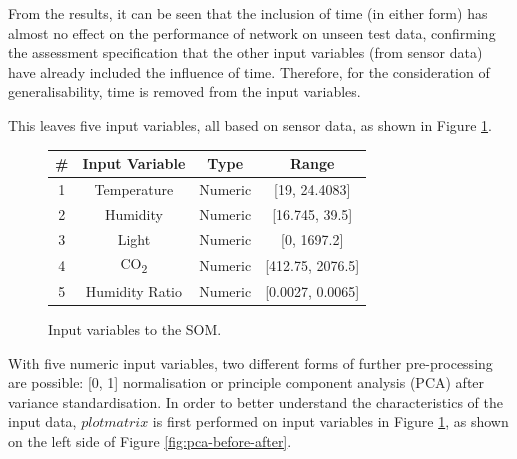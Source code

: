\documentclass[10pt, oneside]{article}
\begin{document}
From the results, it can be seen that the inclusion of time (in either form) has almost no effect on the performance of network on unseen test data, confirming the assessment specification that the other input variables (from sensor data) have already included the influence of time. Therefore, for the consideration of generalisability, time is removed from the input variables.

This leaves five input variables, all based on sensor data, as shown in Figure \ref{fig:final-variables}. 

\begin{figure}[h]
\begin{center}
\fontsize{9}{11}\selectfont
\begin{tabular}{|c|c|c|c|}
\hline 
\# & Input Variable & Type & Range \\ \hline 
1 & Temperature & Numeric & [19, 24.4083] \\ \hline 
2 & Humidity & Numeric & [16.745, 39.5] \\ \hline 
3 & Light & Numeric & [0, 1697.2] \\ \hline 
4 & CO\textsubscript{2} & Numeric & [412.75, 2076.5] \\ \hline
5 & Humidity Ratio & Numeric & [0.0027, 0.0065] \\ \hline
\end{tabular}
\end{center}
\caption{\label{fig:final-variables} Input variables to the SOM.}
\end{figure}

With five numeric input variables, two different forms of further pre-processing are possible: [0, 1] normalisation or principle component analysis (PCA) after variance standardisation. In order to better understand the characteristics of the input data, $plotmatrix$ is first performed on input variables in Figure \ref{fig:final-variables}, as shown on the left side of Figure \ref{fig:pca-before-after}.
\end{document}
